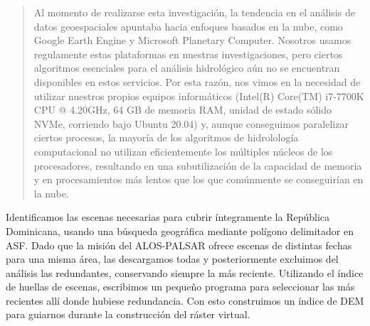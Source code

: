 \documentclass[spanish]{article}
\begin{document}
\begin{quote}
Al momento de realizarse esta investigación, la tendencia en el análisis
de datos geoespaciales apuntaba hacia enfoques basados en la nube, como
Google Earth Engine y Microsoft Planetary Computer. Nosotros usamos
regulamente estas plataformas en nuestras investigaciones, pero ciertos
algoritmos esenciales para el análisis hidrológico aún no se encuentran
disponibles en estos servicios. Por esta razón, nos vimos en la
necesidad de utilizar nuestros propios equipos informáticos (Intel(R)
Core(TM) i7-7700K CPU @ 4.20GHz, 64 GB de memoria RAM, unidad de estado
sólido NVMe, corriendo bajo Ubuntu 20.04) y, aunque conseguimos
paralelizar ciertos procesos, la mayoría de los algoritmos de
hidrolología computacional no utilizan eficientemente los múltiples
núcleos de los procesadores, resultando en una subutilización de la
capacidad de memoria y en procesamientos más lentos que los que
comúnmente se conseguirían en la nube.
\end{quote}

Identificamos las escenas necesarias para cubrir íntegramente la
República Dominicana, usando una búsqueda geográfica mediante polígono
delimitador en ASF. Dado que la misión del ALOS-PALSAR ofrece escenas de
distintas fechas para una misma área, las descargamos todas y
posteriormente excluimos del análisis las redundantes, conservando
siempre la más reciente. Utilizando el índice de huellas de escenas,
escribimos un pequeño programa para seleccionar las más recientes allí
donde hubiese redundancia. Con esto construimos un índice de DEM para
guiarnos durante la construcción del ráster virtual.
\end{document}

